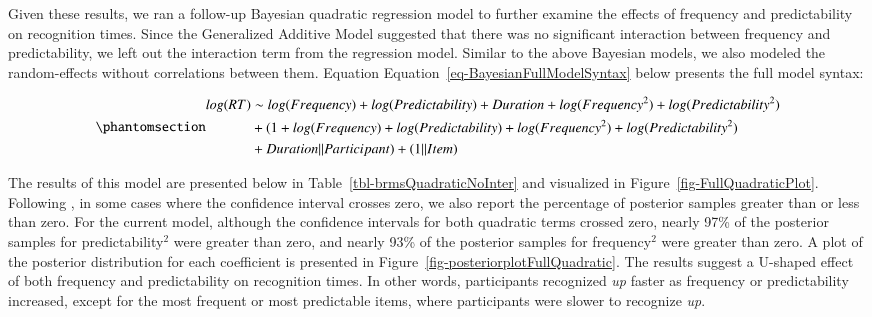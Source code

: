 \documentclass[
  authoryear,
  preprint,
  1p,
  onecolumn]{elsarticle}
\begin{document}
Given these results, we ran a follow-up Bayesian quadratic regression
model to further examine the effects of frequency and predictability on
recognition times. Since the Generalized Additive Model suggested that
there was no significant interaction between frequency and
predictability, we left out the interaction term from the regression
model. Similar to the above Bayesian models, we also modeled the
random-effects without correlations between them. Equation
Equation~\ref{eq-BayesianFullModelSyntax} below presents the full model
syntax:

\begin{equation}\phantomsection\label{eq-BayesianFullModelSyntax}{
\begin{aligned}
log(RT) & \sim  log(Frequency) + log(Predictability) + Duration + log(Frequency^2)  + log(Predictability^2) \\ & + (1 + log(Frequency) + log(Predictability) + log(Frequency^2) + log(Predictability^2) \\& + Duration || Participant) + (1 || Item)
\end{aligned}
}\end{equation}

The results of this model are presented below in
Table~\ref{tbl-brmsQuadraticNoInter} and visualized in
Figure~\ref{fig-FullQuadraticPlot}. Following
\citet{houghtonTaskdependentConsequencesDisfluency2023}, in some cases
where the confidence interval crosses zero, we also report the
percentage of posterior samples greater than or less than zero. For the
current model, although the confidence intervals for both quadratic
terms crossed zero, nearly 97\% of the posterior samples for
predictability\(^2\) were greater than zero, and nearly 93\% of the
posterior samples for frequency\(^2\) were greater than zero. A plot of
the posterior distribution for each coefficient is presented in
Figure~\ref{fig-posteriorplotFullQuadratic}. The results suggest a
U-shaped effect of both frequency and predictability on recognition
times. In other words, participants recognized \emph{up} faster as
frequency or predictability increased, except for the most frequent or
most predictable items, where participants were slower to recognize
\emph{up}.
\end{document}
